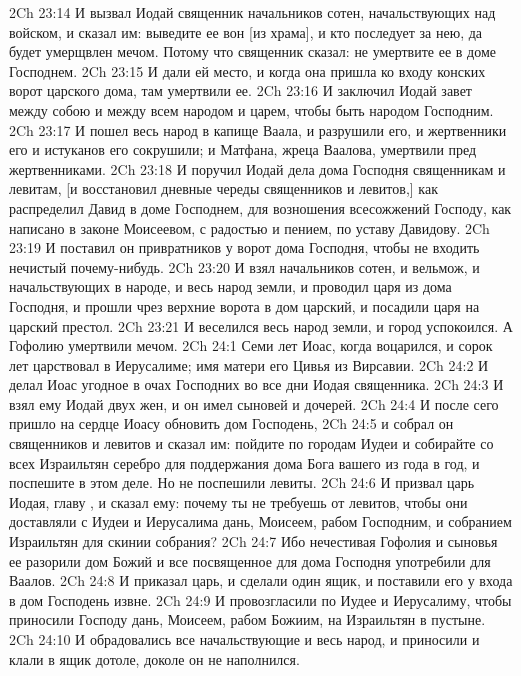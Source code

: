 \vs 2Ch 23:14 И вызвал Иодай священник начальников сотен, начальствующих над войском, и сказал им: выведите ее вон [из храма], и кто последует за нею, да будет умерщвлен мечом. Потому что священник сказал: не умертвите ее в доме Господнем.
\vs 2Ch 23:15 И дали ей место, и когда она пришла ко входу конских ворот царского дома, там умертвили ее.
\rsbpar\vs 2Ch 23:16 И заключил Иодай завет между собою и между всем народом и царем, чтобы быть  народом Господним.
\vs 2Ch 23:17 И пошел весь народ в капище Ваала, и разрушили его, и жертвенники его и истуканов его сокрушили; и Матфана, жреца Ваалова, умертвили пред жертвенниками.
\vs 2Ch 23:18 И поручил Иодай дела дома Господня священникам и левитам, [и восстановил дневные череды священников и левитов,] как распределил Давид в доме Господнем, для возношения всесожжений Господу, как написано в законе Моисеевом, с радостью и пением, по уставу Давидову.
\vs 2Ch 23:19 И поставил он привратников у ворот дома Господня, чтобы не  входить нечистый почему-нибудь.
\vs 2Ch 23:20 И взял начальников сотен, и вельмож, и начальствующих в народе, и весь народ земли, и проводил царя из дома Господня, и прошли чрез верхние ворота в дом царский, и посадили царя на царский престол.
\vs 2Ch 23:21 И веселился весь народ земли, и город успокоился. А Гофолию умертвили мечом.
\vs 2Ch 24:1 Семи лет  Иоас, когда воцарился, и сорок лет царствовал в Иерусалиме; имя матери его Цивья из Вирсавии.
\vs 2Ch 24:2 И делал Иоас угодное в очах Господних во все дни Иодая священника.
\vs 2Ch 24:3 И взял ему Иодай двух жен, и он имел  сыновей и дочерей.
\rsbpar\vs 2Ch 24:4 И после сего пришло на сердце Иоасу обновить дом Господень,
\vs 2Ch 24:5 и собрал он священников и левитов и сказал им: пойдите по городам Иудеи и собирайте со всех Израильтян серебро для поддержания дома Бога вашего из года в год, и поспешите в этом деле. Но не поспешили левиты.
\vs 2Ch 24:6 И призвал царь Иодая, главу , и сказал ему: почему ты не требуешь от левитов, чтобы они доставляли с Иудеи и Иерусалима дань,  Моисеем, рабом Господним, и собранием Израильтян для скинии собрания?
\vs 2Ch 24:7 Ибо нечестивая Гофолия и сыновья ее разорили дом Божий и все посвященное для дома Господня употребили для Ваалов.
\vs 2Ch 24:8 И приказал царь, и сделали один ящик, и поставили его у входа в дом Господень извне.
\vs 2Ch 24:9 И провозгласили по Иудее и Иерусалиму, чтобы приносили Господу дань,  Моисеем, рабом Божиим, на Израильтян в пустыне.
\vs 2Ch 24:10 И обрадовались все начальствующие и весь народ, и приносили и клали в ящик дотоле, доколе он не наполнился.
